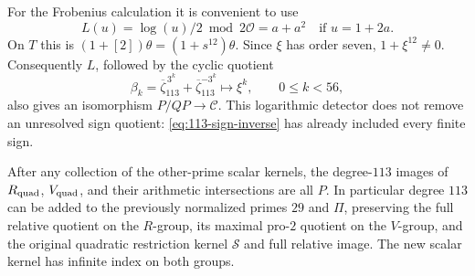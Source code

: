 For the Frobenius calculation it is convenient to use
\[
 L(u)=\log(u)/2\bmod2\mathcal O
     =a+a^2\quad\text{if }u=1+2a.
\]
On \(T\) this is \((1+[2])\theta=(1+s^{12})\theta\).
Since \(\xi\) has order seven, \(1+\xi^{12}\ne0\).
Consequently \(L\), followed by the cyclic quotient
\[
 \beta_k=\overline\zeta_{113}^{\,3^k}
            +\overline\zeta_{113}^{-3^k}\longmapsto\xi^k,
 \qquad0\leq k<56,
\]
also gives an isomorphism \(P/QP\to\mathscr C\).
This logarithmic detector does not remove an unresolved
sign quotient: \eqref{eq:113-sign-inverse} has already
included every finite sign.

\begin{theorem}
\label{thm:113-global-saturation}
After any collection of the other-prime scalar kernels,
the degree-\(113\) images of \(R_{\rm quad}\), \(V_{\rm quad}\),
and their arithmetic intersections are all \(P\).
In particular degree \(113\) can be added to the previously
normalized primes \(29\) and \(\Pi\), preserving the full
relative quotient on the \(R\)-group, its maximal pro-\(2\)
quotient on the \(V\)-group, and the original quadratic
restriction kernel \(\mathcal S\) and full relative image.
The new scalar kernel has infinite index on both groups.
\end{theorem}

